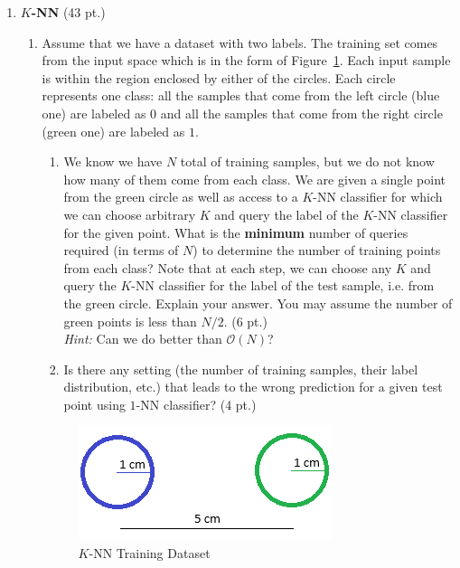 \documentclass{article}
\theoremstyle{definition}
\theoremstyle{remark}
\newenvironment{Q}
        {%
          \clearpage
          \item
        }
        {%
          \phantom{s} 
          \bigskip
        }
\begin{document}
        
\begin{enumerate}[font={\Large\bfseries},left=0pt]






\begin{Q}
\textbf{\Large $K$-NN } (43 pt.) 
\begin{enumerate}
    \item Assume that we have a dataset with two labels. The training set comes from the input space which is in the form of Figure~\ref{fig:circle}. Each input sample is within the region enclosed by either of the circles. Each circle represents one class: all the samples that come from the left circle (blue one) are labeled as $0$ and all the samples that come from the right circle (green one) are labeled as $1$. 
    \begin{enumerate}
        \item We know we have $N$ total of training samples, but we do not know how many of them come from each class. We are given a single point from the green circle as well as access to a $K$-NN classifier for which we can choose arbitrary $K$ and query the label of the $K$-NN classifier for the given point. What is the \textbf{minimum} number of queries required (in terms of $N$) to determine the number of training points from each class? 
        Note that at each step, we can choose any $K$ and query the $K$-NN classifier for the label of the test sample, i.e. from the green circle. Explain your answer.  You may assume the number of green points is less than $N/2$. (6 pt.)\\
        \textit{Hint:} Can we do better than $\mathcal{O}(N)$?
        \item  Is there any setting (the number of training samples, their label distribution, etc.) that leads to the wrong prediction for a given test point using $1$-NN classifier?  (4 pt.)
    \end{enumerate}
    

    \begin{figure}[ht!]
        \centering
        \includegraphics[width=0.5\linewidth]{circles_knn.png}
        \caption{$K$-NN Training Dataset}
        \label{fig:circle}
    \end{figure}


\end{enumerate}
\end{Q}
\end{enumerate}
\end{document}
